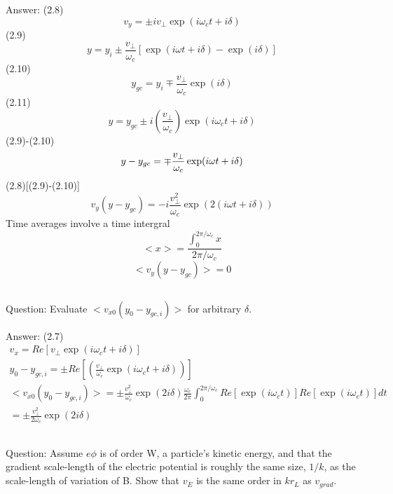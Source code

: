 \documentclass{article}
\begin{document}
Answer: 
(2.8)
\begin{equation}
    v_y=\pm iv_\perp \exp(i\omega_c t + i\delta)
\end{equation}
(2.9)
\begin{equation}
    y=y_i\pm\frac{v_\perp}{\omega_c}[\exp(i\omega t + i\delta)-\exp(i\delta)]
\end{equation}
(2.10)
\begin{equation}
    y_{gc}=y_i\mp \frac{v_\perp}{\omega_c}\exp(i\delta)
\end{equation}
(2.11)
\begin{equation}
    y=y_{gc}\pm i(\frac{v_\perp}{\omega_c})\exp(i\omega_c t + i \delta)
\end{equation}
(2.9)-(2.10)
\begin{equation}
    y-y_{gc}=\mp \frac{v_\perp}{\omega_c}\exp(i\omega t+i\delta)\\
\end{equation}
(2.8)[(2.9)-(2.10)]
\begin{equation}
    v_y(y-y_{gc})=-i\frac{v_\perp^2}{\omega_c}\exp(2(i\omega t+i\delta))
\end{equation}
Time averages involve a time intergral
\begin{equation}
    <x>=\frac{\int_0^{2\pi/\omega_c}x}{2\pi/\omega_c}
\end{equation}
\begin{equation}
    <v_y(y-y_{gc})>=0
\end{equation}

\subsection{}
Question: Evaluate $<v_{x0}(y_0-y_{gc,i})>$ for arbitrary $\delta$.

Answer: 
(2.7)
\begin{eqnarray*}
    v_x=Re[v_\perp\exp(i\omega_c t+ i\delta)]\\
    y_0-y_{gc,i}=\pm Re[(\frac{v_\perp}{\omega_c}\exp(i \omega_c t + i \delta))]\\
    <v_{x0}(y_0-y_{gc,i})>=\pm \frac{v_\perp^2}{\omega_c}\exp(2i \delta)\frac{\omega_c}{2\pi}\int_0^{2\pi/\omega_c}Re[\exp(i\omega_ct)]Re[\exp(i\omega_c t)]dt\\
    =\pm \frac{v_\perp^2}{2\omega_c}\exp(2i\delta)
\end{eqnarray*}

\subsection{}
Question: Assume $e\phi$ is of order W, a particle's kinetic energy, and that the gradient scale-length of the electric potential is roughly the same size, $1/k$, as the scale-length of variation of B. 
Show that $v_E$ is the same order in $kr_L$ as $v_{grad}$.
\end{document}
